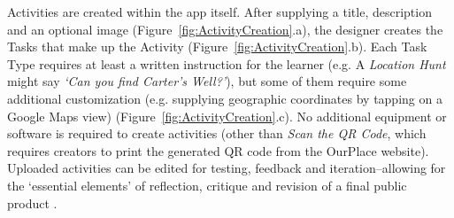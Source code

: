 Activities are created within the app itself. After supplying a title, description and an optional image (Figure~\ref{fig:ActivityCreation}.a), the designer creates the Tasks that make up the Activity (Figure~\ref{fig:ActivityCreation}.b). Each Task Type requires at least a written instruction for the learner (e.g. A \textit{Location Hunt} might say \textit{`Can you find Carter's Well?'}), but some of them require some additional customization (e.g. supplying geographic coordinates by tapping on a Google Maps view) (Figure~\ref{fig:ActivityCreation}.c). No additional equipment or software is required to create activities (other than \textit{Scan the QR Code}, which requires creators to print the generated QR code from the OurPlace website). Uploaded activities can be edited for testing, feedback and iteration--allowing for the `essential elements' of reflection, critique and revision of a final public product \citep{Larmer2015}. 
